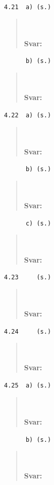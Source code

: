 \documentclass[a4paper]{article}
\newcommand{\tskcol}[1]{\textcolor{tskcol}{#1}}
\begin{document}
\texttt{\tskcol{4.21~~a) (s.)}}
\begin{quotation}
	\noindent
	\\ \\
	\textbf{Svar:}
\end{quotation}

\texttt{\tskcol{~~~~~~b) (s.)}}
\begin{quotation}
	\noindent
	\\ \\
	\textbf{Svar:}
\end{quotation}

\texttt{\tskcol{4.22~~a) (s.)}}
\begin{quotation}
	\noindent
	\\ \\
	\textbf{Svar:}
\end{quotation}

\texttt{\tskcol{~~~~~~b) (s.)}}
\begin{quotation}
	\noindent
	\\ \\
	\textbf{Svar:}
\end{quotation}

\texttt{\tskcol{~~~~~~c) (s.)}}
\begin{quotation}
	\noindent
	\\ \\
	\textbf{Svar:}
\end{quotation}

\texttt{\tskcol{4.23~~~~ (s.)}}
\begin{quotation}
	\noindent
	\\ \\
	\textbf{Svar:}
\end{quotation}

\texttt{\tskcol{4.24~~~~ (s.)}}
\begin{quotation}
	\noindent
	\\ \\
	\textbf{Svar:}
\end{quotation}

\texttt{\tskcol{4.25~~a) (s.)}}
\begin{quotation}
	\noindent
	\\ \\
	\textbf{Svar:}
\end{quotation}

\texttt{\tskcol{~~~~~~b) (s.)}}
\begin{quotation}
	\noindent
	\\ \\
	\textbf{Svar:}
\end{quotation}
\end{document}
